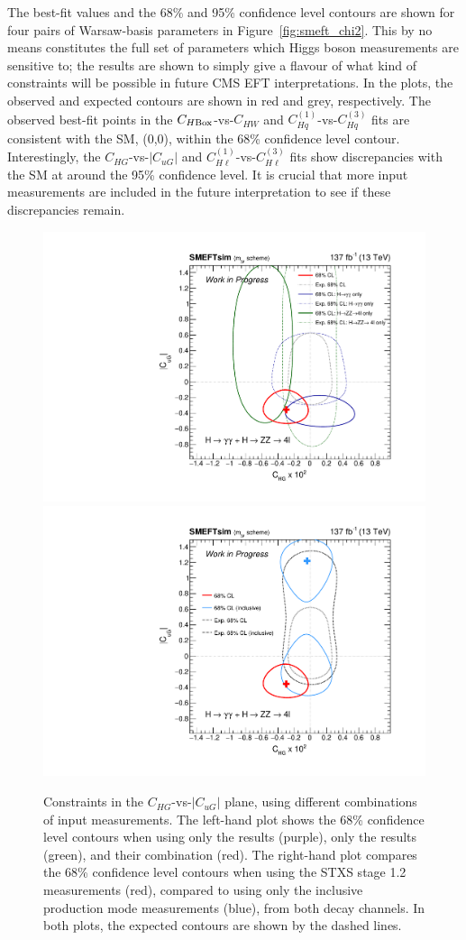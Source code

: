 The best-fit values and the 68\% and 95\% confidence level contours are shown for four pairs of Warsaw-basis parameters in Figure~\ref{fig:smeft_chi2}. This by no means constitutes the full set of parameters which Higgs boson measurements are sensitive to; the results are shown to simply give a flavour of what kind of constraints will be possible in future CMS EFT interpretations. In the plots, the observed and expected contours are shown in red and grey, respectively. The observed best-fit points in the $C_{H{\rm{Box}}}$-vs-$C_{HW}$ and $C^{(1)}_{Hq}$-vs-$C^{(3)}_{Hq}$ fits are consistent with the SM, (0,0), within the 68\% confidence level contour. Interestingly, the $C_{HG}$-vs-$|C_{uG}|$ and $C^{(1)}_{H\ell}$-vs-$C^{(3)}_{H\ell}$ fits show discrepancies with the SM at around the 95\% confidence level. It is crucial that more input measurements are included in the future interpretation to see if these discrepancies remain.

\begin{figure}
  \centering
  \includegraphics[width=.49\textwidth]{Figures/eft/smeft/chi2_chg_vs_cugabs_channelComp.pdf}
  \includegraphics[width=.49\textwidth]{Figures/eft/smeft/chi2_chg_vs_cugabs_stageComp.pdf}
  \caption[Constraints on Warsaw-basis parameters using different input measurements]
  {
    Constraints in the $C_{HG}$-vs-$|C_{uG}|$ plane, using different combinations of input measurements. The left-hand plot shows the 68\% confidence level contours when using only the \Hgg results (purple), only the \Hfl results (green), and their combination (red). The right-hand plot compares the 68\% confidence level contours when using the STXS stage 1.2 measurements (red), compared to using only the inclusive production mode measurements (blue), from both decay channels. In both plots, the expected contours are shown by the dashed lines.
  }
  \label{fig:smeft_chi2_comp}
\end{figure}


